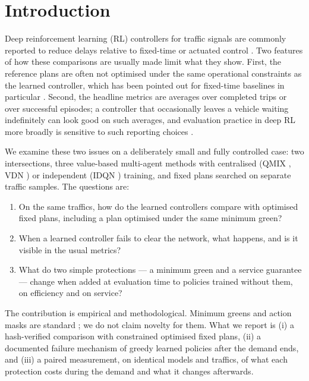\documentclass[11pt]{article}
\begin{document}
\section{Introduction}
Deep reinforcement learning (RL) controllers for traffic signals are commonly reported to reduce delays
relative to fixed-time or actuated control \cite{wei2018intellilight,wei2019presslight,wei2019colight,chen2020thousand,chu2020multiagent,haydari2022survey,noaeen2022review}.
Two features of how these comparisons are usually made limit what they show. First, the reference plans are
often not optimised under the same operational constraints as the learned controller, which has been
pointed out for fixed-time baselines in particular \cite{ault2020interpretable,ault2021resco}. Second, the
headline metrics are averages over completed trips or over successful episodes; a controller that
occasionally leaves a vehicle waiting indefinitely can look good on such averages, and evaluation practice
in deep RL more broadly is sensitive to such reporting choices \cite{henderson2018matters,agarwal2021precipice,jayawardana2022underspecification,varela2021methodology}.

We examine these two issues on a deliberately small and fully controlled case: two intersections, three
value-based multi-agent methods with centralised (QMIX \cite{rashid2020qmix}, VDN \cite{sunehag2018vdn}) or
independent (IDQN \cite{tampuu2017multiagent,mnih2015human}) training, and fixed plans searched on separate
traffic samples. The questions are:
\begin{enumerate}
\item On the same traffics, how do the learned controllers compare with optimised fixed plans, including a
plan optimised under the same minimum green?
\item When a learned controller fails to clear the network, what happens, and is it visible in the usual
metrics?
\item What do two simple protections --- a minimum green and a service guarantee --- change when added at
evaluation time to policies trained without them, on efficiency and on service?
\end{enumerate}
The contribution is empirical and methodological. Minimum greens and action masks are standard
\cite{huang2022masking,alshiekh2018shielding}; we do not claim novelty for them. What we report is (i) a
hash-verified comparison with constrained optimised fixed plans, (ii) a documented failure mechanism of
greedy learned policies after the demand ends, and (iii) a paired measurement, on identical models and
traffics, of what each protection costs during the demand and what it changes afterwards.
\end{document}
